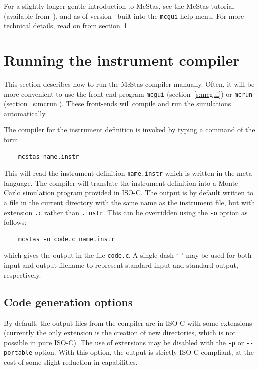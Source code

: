 For a slightly longer gentle introduction to McStas, see the McStas
tutorial (available from~\cite{mcstas_webpage}), and as of version
\version\ built into the \verb+mcgui+ help menu. For more technical
details, read on from section~\ref{s:running}

\section{Running the instrument compiler}
\label{s:running}

This section describes how to run the McStas compiler manually. Often,
it will be more convenient to use the front-end program \verb+mcgui+
(section~\ref{s:mcgui}) or \verb+mcrun+ (section~\ref{s:mcrun}). These
front-ends will compile and run the simulations automatically.
 

The compiler for the \MCS{} instrument definition
is invoked by typing a command of the form
\begin{lstlisting}
    mcstas name.instr
\end{lstlisting}
This will read the instrument definition \verb+name.instr+ which is
written in the \MCS meta-language. The compiler will translate the
instrument definition into a Monte Carlo simulation program provided in
ISO-C. The output is by default written to a file in the current
directory with the same name as the instrument file, but with extension
\verb+.c+ rather than \verb+.instr+. This can be overridden using the
\verb+-o+ option as follows:
\begin{lstlisting}
    mcstas -o code.c name.instr
\end{lstlisting}
which gives the output in the file \verb+code.c+.
A single dash `\verb+-+' may be used for both input and output filename
to represent standard input and standard output, respectively.


\subsection{Code generation options}

By default, the output files from the \MCS compiler are in ISO-C with
some extensions (currently the only extension is the creation of new
directories, which is not possible in pure ISO-C). The use of
extensions may be disabled with the \verb+-p+ or \verb+--portable+
option. With this option, the output is strictly ISO-C compliant, at
the cost of some slight reduction in capabilities.

